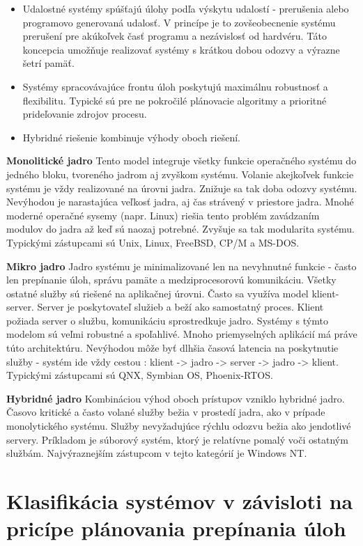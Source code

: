 \begin{itemize}
	\item Udalostné systémy spúšťajú úlohy podľa výskytu udalostí - prerušenia alebo programovo generovaná udalosť. V princípe je to zovšeobecnenie systému prerušení pre akúkoľvek časť programu a nezávislosť od hardvéru. Táto koncepcia umožňuje realizovať systémy s krátkou dobou odozvy a výrazne šetrí pamäť.
	\item Systémy spracovávajúce frontu úloh poskytujú maximálnu robustnosť a flexibilitu. Typické sú pre ne pokročilé plánovacie algoritmy a prioritné prideľovanie zdrojov procesu.
	\item Hybridné riešenie kombinuje výhody oboch riešení.
\end{itemize}

\textbf{Monolitické jadro}
Tento model integruje všetky funkcie operačného systému do jedného bloku, tvoreného jadrom aj zvyškom systému. Volanie akejkoľvek funkcie systému je vždy realizované na úrovni jadra. Znižuje sa tak doba odozvy systému. Nevýhodou je narastajúca veľkosť jadra, aj čas strávený v priestore jadra. Mnohé moderné operačné sysemy (napr. Linux) riešia tento problém zavádzaním modulov do jadra až keď sú naozaj potrebné. Zvyšuje sa tak modularita systému. Typickými zástupcami sú Unix, Linux, FreeBSD, CP/M a MS-DOS. 

\textbf{Mikro jadro}
Jadro systému je minimalizované len na nevyhnutné funkcie - často len prepínanie úloh, správu pamäte a medziprocesorovú komunikáciu. Všetky ostatné služby sú riešené na aplikačnej úrovni. Často sa využíva model klient-server. Server je poskytovateľ služieb a beží ako samostatný proces. Klient požiada server o službu, komunikáciu sprostredkuje jadro. Systémy s týmto modelom sú veľmi robustné a spoľahlivé. Mnoho priemyselných aplikácií má práve túto architektúru. Nevýhodou môže byť dlhšia časová latencia na poskytnutie služby - systém ide vždy cestou : klient -> jadro -> server -> jadro -> klient. Typickými zástupcami sú QNX, Symbian OS, Phoenix-RTOS.

\textbf{Hybridné jadro}
Kombináciou výhod oboch prístupov vzniklo hybridné jadro. Časovo kritické a často volané služby bežia v prostedí jadra, ako v prípade monolytického systému. Služby nevyžadujúce rýchlu odozvu bežia ako jendotlivé servery. Príkladom je súborový systém, ktorý je relatívne pomalý voči ostatným službám. Najvýraznejším zástupcom v tejto kategórií je Windows NT.

\section{Klasifikácia systémov v závisloti na pricípe plánovania prepínania úloh}
